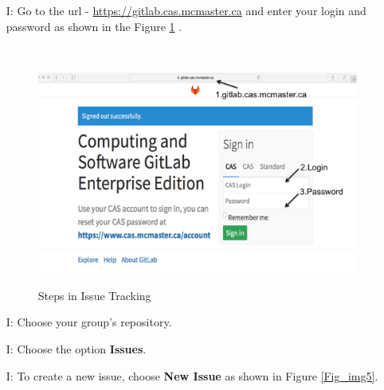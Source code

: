 \documentclass[11pt, oneside]{article}   	%
\newcounter{insnum} %
\begin{document}
\begin{itemize}

\item[I\refstepcounter{insnum}\theinsnum \label{i_one}:] Go to the url -
  \url{https://gitlab.cas.mcmaster.ca} and enter your login and password as
  shown in the Figure \ref{Fig_img1} .

  ~\newline
\begin{figure}[ht]
\begin{center}
\caption{\label{Fig_img1} Steps in Issue Tracking}
{
 \includegraphics[width=1.00\textwidth]{img1.png}
}
\end{center}
\end{figure}
\clearpage

\item[I\refstepcounter{insnum}\theinsnum \label{i_two}:] Choose
your group's repository.

\item[I\refstepcounter{insnum}\theinsnum \label{i_three}:] Choose the option
\textbf{Issues}.



\item[I\refstepcounter{insnum}\theinsnum \label{i_five}:]To create a
              new issue, choose \textbf{New Issue} as shown in Figure
              \ref{Fig_img5}.


\end{itemize}
\end{document}
